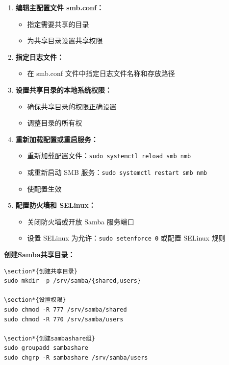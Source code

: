 \documentclass[12pt,UTF8]{ctexbook}
\begin{document}
\begin{enumerate}
    \item \textbf{编辑主配置文件 smb.conf：}
    \begin{itemize}
        \item 指定需要共享的目录
        \item 为共享目录设置共享权限
    \end{itemize}
    
    \item \textbf{指定日志文件：}
    \begin{itemize}
        \item 在 smb.conf 文件中指定日志文件名称和存放路径
    \end{itemize}
    
    \item \textbf{设置共享目录的本地系统权限：}
    \begin{itemize}
        \item 确保共享目录的权限正确设置
        \item 调整目录的所有权
    \end{itemize}
    
    \item \textbf{重新加载配置或重启服务：}
    \begin{itemize}
        \item 重新加载配置文件：\texttt{sudo systemctl reload smb nmb}
        \item 或重新启动 SMB 服务：\texttt{sudo systemctl restart smb nmb}
        \item 使配置生效
    \end{itemize}
    
    \item \textbf{配置防火墙和 SELinux：}
    \begin{itemize}
        \item 关闭防火墙或开放 Samba 服务端口
        \item 设置 SELinux 为允许：\texttt{sudo setenforce 0} 或配置 SELinux 规则
    \end{itemize}
\end{enumerate}

\textbf{创建Samba共享目录：}
\begin{verbatim}
\section*{创建共享目录}
sudo mkdir -p /srv/samba/{shared,users}

\section*{设置权限}
sudo chmod -R 777 /srv/samba/shared
sudo chmod -R 770 /srv/samba/users

\section*{创建sambashare组}
sudo groupadd sambashare
sudo chgrp -R sambashare /srv/samba/users
\end{verbatim}
\end{document}

